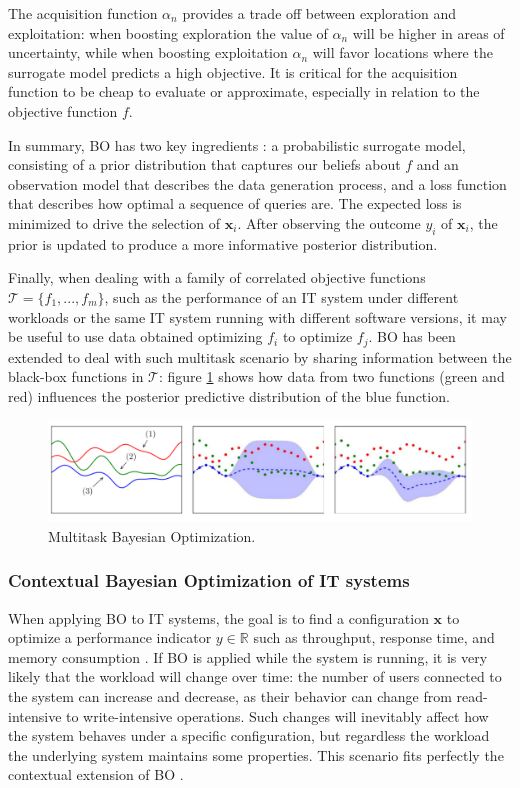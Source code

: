 \documentclass[a4paper]{article} %
\begin{document}
	The acquisition function $\alpha_n$ provides a trade off between exploration and exploitation: when boosting exploration the value of $\alpha_n$ will be higher in areas of uncertainty, while when boosting exploitation $\alpha_n$ will favor locations where the surrogate model predicts a high objective. It is critical for the acquisition function to be cheap to evaluate or approximate, especially in relation to the objective function $f$.
	
	In summary, BO has two key ingredients \cite{BO}: a probabilistic surrogate model, consisting of a prior distribution that captures our beliefs about $f$ and an observation model that describes the data generation process, and a loss function that describes how optimal a sequence of queries are. The expected loss is minimized to drive the selection of $\pmb{x}_i$. After observing the outcome $y_i$ of $\pmb{x}_i$, the prior is updated to produce a more informative posterior distribution.
	
	Finally, when dealing with a family of correlated objective functions $\mathcal{T}=\{f_1, ..., f_m\}$, such as the performance of an IT system under different workloads or the same IT system running with different software versions, it may be useful to use data obtained optimizing $f_i$ to optimize $f_j$. BO has been extended to deal with such multitask scenario by sharing information between the black-box functions in $\mathcal{T}$: figure \ref{fig:multitask_bo} shows how data from two functions (green and red) influences the posterior predictive distribution of the blue function.
	\begin{figure} \label{fig:multitask_bo}
		\includegraphics[width=\linewidth]{img/multitask_bo.png}
		\caption{Multitask Bayesian Optimization.}
	\end{figure}
	
	\subsubsection{Contextual Bayesian Optimization of IT systems} \label{ssec:contextual_bayesian_optimization}
	
	When applying BO to IT systems, the goal is to find a configuration $\pmb{x}$ to optimize a performance indicator $y \in \mathbb{R}$ such as throughput, response time, and memory consumption \cite{AkamasCGP}. If BO is applied while the system is running, it is very likely that the workload will change over time: the number of users connected to the system can increase and decrease, as their behavior can change from read-intensive to write-intensive operations. Such changes will inevitably affect how the system behaves under a specific configuration, but regardless the workload the underlying system maintains some properties. This scenario fits perfectly the contextual extension of BO \cite{CGPBanditOptimization}.
	
\end{document}
